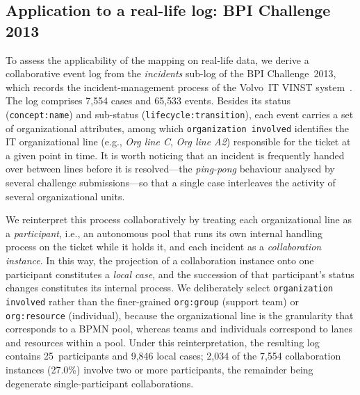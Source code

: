 \subsection{Application to a real-life log: BPI Challenge 2013}
\label{sec:bpi2013-application}

To assess the applicability of the mapping on real-life data, we derive a
collaborative event log from the \emph{incidents} sub-log of the BPI
Challenge~2013, which records the incident-management process of the Volvo~IT
VINST system~\citep{vandongen2013bpi,steeman2013bpi}. The log comprises 7{,}554
cases and 65{,}533 events. Besides its status (\texttt{concept:name}) and
sub-status (\texttt{lifecycle:transition}), each event carries a set of
organizational attributes, among which \texttt{organization involved}
identifies the IT organizational line (e.g., \emph{Org line C}, \emph{Org line
A2}) responsible for the ticket at a given point in time. It is worth noticing
that an incident is frequently handed over between lines before it is
resolved---the \emph{ping-pong} behaviour analysed by several challenge
submissions---so that a single case interleaves the activity of several
organizational units.

We reinterpret this process collaboratively by treating each organizational
line as a \emph{participant}, i.e., an autonomous pool that runs its own
internal handling process on the ticket while it holds it, and each incident
as a \emph{collaboration instance}. In this way, the projection of a
collaboration instance onto one participant constitutes a \emph{local case},
and the succession of that participant's status changes constitutes its
internal process. We deliberately select \texttt{organization involved}
rather than the finer-grained \texttt{org:group} (support team) or
\texttt{org:resource} (individual), because the organizational line is the
granularity that corresponds to a BPMN pool, whereas teams and individuals
correspond to lanes and resources within a pool. Under this reinterpretation,
the resulting log contains 25~participants and 9{,}846 local cases; 2{,}034
of the 7{,}554 collaboration instances (27.0\%) involve two or more
participants, the remainder being degenerate single-participant
collaborations.

